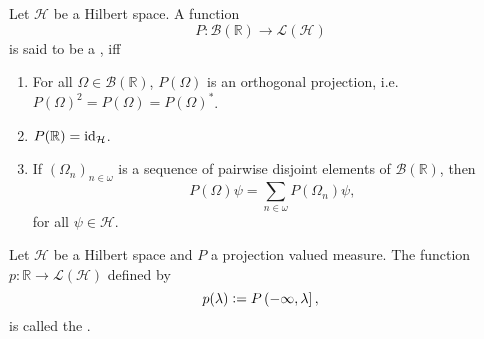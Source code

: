 \begin{definition}
	Let $\mathcal{H}$ be a Hilbert space. A function 
	\begin{equation*}
		P : \mathcal{B}(\mathbb{R}) \to \mathcal{L}(\mathcal{H})
	\end{equation*}
	\noindent is said to be a , iff
	\begin{enumerate}[label = \textup{(}\roman*\textup{)},wide=0pt]
		\item For all $\Omega \in \mathcal{B}(\mathbb{R})$, $P(\Omega)$ is an orthogonal projection, i.e. $P(\Omega)^2 = P(\Omega) = P(\Omega)^*$.
		\item $P(\mathbb{R}) = \operatorname{id}_\mathcal{H}$.
		\item If $(\Omega_n)_{n \in \omega}$ is a sequence of pairwise disjoint elements of $\mathcal{B}(\mathbb{R})$, then
			\begin{equation*}
				P(\Omega)\psi = \sum_{n \in \omega} P(\Omega_n)\psi,
			\end{equation*}
			\noindent for all $\psi \in \mathcal{H}$.
	\end{enumerate}
\end{definition}

\begin{definition}
	Let $\mathcal{H}$ be a Hilbert space and $P$ a projection valued measure. The function $p : \mathbb{R} \to \mathcal{L}(\mathcal{H})$ defined by
	\begin{equation*}
		p(\lambda) := P\intoc{-\infty,\lambda},
	\end{equation*}
	\noindent is called the .
\end{definition}

